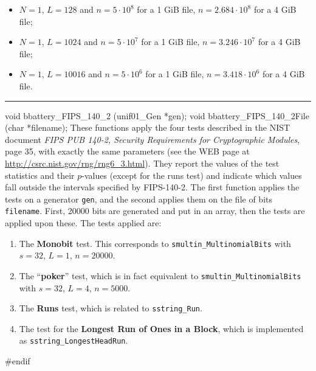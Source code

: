 \begin{enumerate}
 \begin{itemize}
   \item $N=1$, $L=128$ and $n=5\cdot10^8$ for a 1 GiB file, $n=2.684\cdot10^8$
     for a 4 GiB file;
   \item $N=1$, $L=1024$ and $n=5\cdot10^7$ for a 1 GiB file, $n=3.246\cdot10^7$
     for a 4 GiB file;
   \item $N=1$, $L=10016$ and $n=5\cdot10^6$ for a 1 GiB file, $n=3.418\cdot10^6$
     for a 4 GiB file.
\end{itemize}

\end{enumerate}


\bigskip
\hrule
\code


void bbattery_FIPS_140_2 (unif01_Gen *gen);
void bbattery_FIPS_140_2File (char *filename);
\endcode
\tab
{}%
 These functions apply the four tests described in the NIST document
 {\sl FIPS PUB 140-2, Security Requirements for Cryptographic Modules},
 page 35, with exactly the same parameters (see the WEB page at
  \url{http://csrc.nist.gov/rng/rng6_3.html}).  They report the values
 of the test statistics and their $p$-values (except for the runs test)
 and indicate which values fall outside the intervals specified by
 FIPS-140-2. The first function applies the tests on a generator {\tt gen},
 and the second applies them on the file of bits {\tt filename}. First,
 20000 bits are generated and put in an array, then the tests are applied
 upon these. The tests applied are:
\endtab

\begin{enumerate}
\item The {\bf Monobit} test. This corresponds to
 {\tt smultin\_MultinomialBits} with $s=32$, $L=1$, $n=20000$.

\item The ``{\bf poker}'' test, which is in fact equivalent to
 {\tt smultin\_MultinomialBits} with $s=32$, $L=4$, $n=5000$.

\item The {\bf Runs} test, which is related to {\tt sstring\_Run}.

\item The test for the {\bf Longest Run of Ones in a Block},
 which is implemented as {\tt sstring\_LongestHeadRun}.
\end{enumerate}


\code
\hide
#endif
\endhide
\endcode
